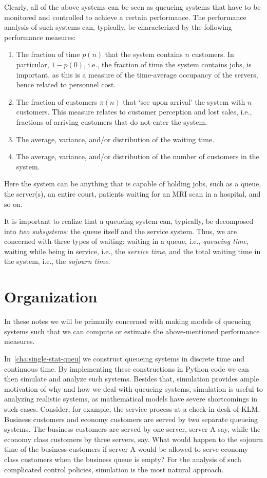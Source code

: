 Clearly, all of the above systems can be seen as queueing systems that
have to be monitored and controlled to achieve a certain
performance. The performance analysis of such systems can, typically,
be characterized by the following performance measures:
\begin{enumerate}
\item The fraction of time $p(n)$ that the system contains $n$ customers.
  In particular, $1-p(0)$, i.e., the fraction of time the system contains jobs, is important, as this is a measure of the time-average occupancy of the servers, hence related to personnel cost.
\item The fraction of customers $\pi(n)$ that `see upon arrival' the system with $n$ customers.
  This measure relates to customer perception and lost sales, i.e., fractions of arriving customers that do not enter the system.
\item The average, variance, and/or distribution of the waiting time.
\item The average, variance, and/or distribution of the number of customers in the system.\
\end{enumerate}
Here the system can be anything that is capable of holding jobs, such
as a queue, the server(s), an entire court, patients waiting for
an MRI scan in a hospital, and so on.

It is important to realize that a queueing system can, typically, be
decomposed into \emph{two subsystems}: the queue itself and the
service system. Thus, we are concerned with three types of waiting:
waiting in a queue, i.e., \emph{queueing time}, waiting while being in
service, i.e., the \emph{service time}, and the total waiting time in
the system, i.e., the \emph{sojourn time}.

\section*{Organization}


In these notes we will be primarily concerned with making models of queueing systems such that we can compute or estimate the above-mentioned performance measures.

In~\cref{cha:single-stat-queu} we construct queueing systems in discrete time and continuous time.
By implementing these constructions in Python code we can then simulate and analyze such systems.
Besides that, simulation provides ample motivation of why and how we deal with queueing systems, simulation is useful to analyzing realistic systems, as mathematical models have severe shortcomings in such cases.
Consider, for example, the service process at a check-in desk of KLM.
Business customers and economy customers are served by two separate queueing systems.
The business customers are served by one server, server A say, while the economy class customers by three servers, say.
What would happen to the sojourn time of the business customers if server A would be allowed to serve economy class customers when the business queue is empty?
For the analysis of such complicated control policies, simulation is the most natural approach.

